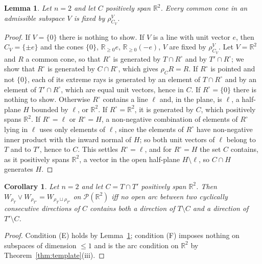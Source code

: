 \documentclass[11pt]{amsart}
\newtheorem{lem}[thm]{Lemma}
\newtheorem{cor}[thm]{Corollary}
\theoremstyle{definition}
\newcommand{\cP}{\mathcal P}
\begin{document}
\begin{lem}\label{lem:planecone}
Let $n=2$ and let $C$ positively span $\mathbb R^2$. Every common cone
in an admissible subspace $V$ is fixed by $\rho^V_{C_V}$.
\end{lem}
\begin{proof}
If $V=\{0\}$ there is nothing to show. If $V$ is a line with unit
vector $e$, then $C_V=\{\pm e\}$ and the cones $\{0\}$, $\mathbb R_{\ge
0}e$, $\mathbb R_{\ge0}(-e)$, $V$ are fixed by $\rho^V_{C_V}$. Let $V=
\mathbb R^2$ and $R$ a common cone, so that $R^\circ$ is generated by
$T\cap R^\circ$ and by $T'\cap R^\circ$; we show that $R^\circ$ is
generated by $C\cap R^\circ$, which gives $\rho_CR=R$. If $R^\circ$ is
pointed and not $\{0\}$, each of its extreme rays is generated by an
element of $T\cap R^\circ$ and by an element of $T'\cap R^\circ$, which
are equal unit vectors, hence in $C$. If $R^\circ=\{0\}$ there is
nothing to show. Otherwise $R^\circ$ contains a line $\ell$ and, in the
plane, is $\ell$, a half-plane $H$ bounded by $\ell$, or $\mathbb R^2$.
If $R^\circ=\mathbb R^2$, it is generated by $C$, which positively
spans $\mathbb R^2$. If $R^\circ=\ell$ or $R^\circ=H$, a non-negative
combination of elements of $R^\circ$ lying in $\ell$ uses only
elements of $\ell$, since the elements of $R^\circ$ have non-negative
inner product with the inward normal of $H$; so both unit vectors of
$\ell$ belong to $T$ and to $T'$, hence to $C$. This settles $R^\circ=
\ell$, and for $R^\circ=H$ the set $C$ contains, as it positively spans
$\mathbb R^2$, a vector in the open half-plane $H\setminus\ell$, so
$C\cap H$ generates $H$.
\end{proof}

\begin{cor}\label{cor:plane}
Let $n=2$ and let $C=T\cap T'$ positively span $\mathbb R^2$. Then
$W_{\rho_T}\vee W_{\rho_{T'}}=W_{\rho_T\sqcup\rho_{T'}}$ on $\cP(\mathbb
R^2)$ iff no open arc between two cyclically consecutive directions of
$C$ contains both a direction of $T\setminus C$ and a direction of
$T'\setminus C$.
\end{cor}
\begin{proof}
Condition (E) holds by Lemma~\ref{lem:planecone}; condition (F) imposes
nothing on subspaces of dimension $\le1$ and is the arc condition on
$\mathbb R^2$ by Theorem~\ref{thm:template}(iii).
\end{proof}
\end{document}
